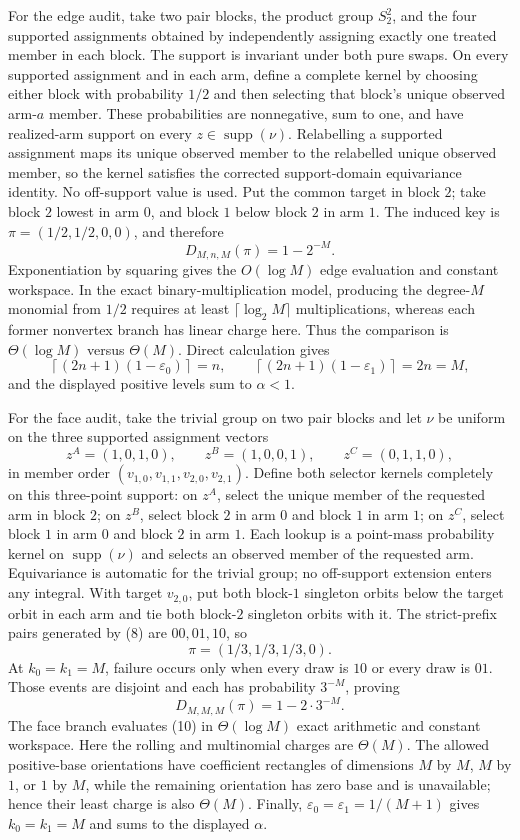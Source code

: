 For the edge audit, take two pair blocks, the product group \(S_2^2\), and the four supported assignments obtained by independently assigning exactly one treated member in each block. The support is invariant under both pure swaps. On every supported assignment and in each arm, define a complete kernel by choosing either block with probability \(1/2\) and then selecting that block's unique observed arm-\(a\) member. These probabilities are nonnegative, sum to one, and have realized-arm support on every \(z\in\operatorname{supp}(\nu)\). Relabelling a supported assignment maps its unique observed member to the relabelled unique observed member, so the kernel satisfies the corrected support-domain equivariance identity. No off-support value is used. Put the common target in block \(2\); take block \(2\) lowest in arm \(0\), and block \(1\) below block \(2\) in arm \(1\). The induced key is \(\pi=(1/2,1/2,0,0)\), and therefore
\[
D_{M,n,M}(\pi)=1-2^{-M}.
\]
Exponentiation by squaring gives the \(O(\log M)\) edge evaluation and constant workspace. In the exact binary-multiplication model, producing the degree-\(M\) monomial from \(1/2\) requires at least \(\lceil\log_2M\rceil\) multiplications, whereas each former nonvertex branch has linear charge here. Thus the comparison is \(\Theta(\log M)\) versus \(\Theta(M)\). Direct calculation gives
\[
\left\lceil(2n+1)(1-\varepsilon_0)\right\rceil=n,
\qquad
\left\lceil(2n+1)(1-\varepsilon_1)\right\rceil=2n=M,
\]
and the displayed positive levels sum to \(\alpha<1\).

For the face audit, take the trivial group on two pair blocks and let \(\nu\) be uniform on the three supported assignment vectors
\[
z^A=(1,0,1,0),\qquad z^B=(1,0,0,1),\qquad z^C=(0,1,1,0),
\tag{8}
\]
in member order \((v_{1,0},v_{1,1},v_{2,0},v_{2,1})\). Define both selector kernels completely on this three-point support: on \(z^A\), select the unique member of the requested arm in block \(2\); on \(z^B\), select block \(2\) in arm \(0\) and block \(1\) in arm \(1\); on \(z^C\), select block \(1\) in arm \(0\) and block \(2\) in arm \(1\). Each lookup is a point-mass probability kernel on \(\operatorname{supp}(\nu)\) and selects an observed member of the requested arm. Equivariance is automatic for the trivial group; no off-support extension enters any integral. With target \(v_{2,0}\), put both block-\(1\) singleton orbits below the target orbit in each arm and tie both block-\(2\) singleton orbits with it. The strict-prefix pairs generated by (8) are \(00,01,10\), so
\[
\pi=(1/3,1/3,1/3,0).
\tag{9}
\]
At \(k_0=k_1=M\), failure occurs only when every draw is \(10\) or every draw is \(01\). Those events are disjoint and each has probability \(3^{-M}\), proving
\[
D_{M,M,M}(\pi)=1-2\cdot3^{-M}.
\tag{10}
\]
The face branch evaluates (10) in \(\Theta(\log M)\) exact arithmetic and constant workspace. Here the rolling and multinomial charges are \(\Theta(M)\). The allowed positive-base orientations have coefficient rectangles of dimensions \(M\) by \(M\), \(M\) by \(1\), or \(1\) by \(M\), while the remaining orientation has zero base and is unavailable; hence their least charge is also \(\Theta(M)\). Finally, \(\varepsilon_0=\varepsilon_1=1/(M+1)\) gives \(k_0=k_1=M\) and sums to the displayed \(\alpha\).

